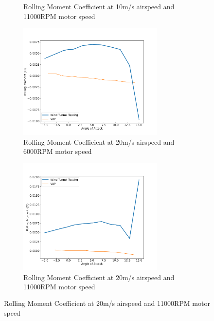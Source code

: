 \begin{figure}[H]
\begin{subfigure}[b]{0.467\textwidth}
        \caption{Rolling Moment Coefficient at 10m/s airspeed and 11000RPM motor speed}
        \label{fig:VAP_pusher_Cl_10ms_11000}
    \end{subfigure}
    \begin{subfigure}[b]{0.467\textwidth}
        \centering
        \includegraphics[width=0.8\textwidth]{05_Results/VAP/pusher/Cl/20ms_6000RPM_Cl.png}
        \caption{Rolling Moment Coefficient at 20m/s airspeed and 6000RPM motor speed}
        \label{fig:VAP_psuher_Cl_20ms_6000}
    \end{subfigure}
    \begin{subfigure}[b]{0.467\textwidth}
        \centering
        \includegraphics[width=0.8\textwidth]{05_Results/VAP/pusher/Cl/20ms_11000RPM_Cl.png}
        \caption{Rolling Moment Coefficient at 20m/s airspeed and 11000RPM motor speed}
        \label{fig:VAP_pusher_Cl_20ms_11000}
    \end{subfigure}
\end{figure}

